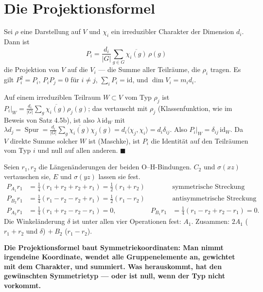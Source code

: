 \section{Die Projektionsformel}

\begin{merksatz}
Sei $\rho$ eine Darstellung auf $V$ und $\chi_i$ ein irreduzibler Charakter der Dimension $d_i$. Dann ist
\[ P_i = \frac{d_i}{|G|}\sum_{g\in G}\overline{\chi_i(g)}\,\rho(g) \]
die Projektion von $V$ auf die  $V_i$ --- die Summe aller Teilräume, die $\rho_i$ tragen. Es gilt $P_i^{2} = P_i$, $P_iP_j = 0$ für $i\neq j$, $\sum_iP_i = \mathrm{id}$, und $\dim V_i = m_id_i$.

Auf einem irreduziblen Teilraum $W\subset V$ vom Typ $\rho_j$ ist $P_i|_W = \frac{d_i}{|G|}\sum_g\overline{\chi_i(g)}\rho_j(g)$; das vertauscht mit $\rho_j$ (Klassenfunktion, wie im Beweis von Satz 4.5b), ist also $\lambda\,\mathrm{id}_W$ mit $\lambda d_j = \operatorname{Spur} = \frac{d_i}{|G|}\sum_g\overline{\chi_i(g)}\chi_j(g) = d_i\langle\chi_j, \chi_i\rangle = d_i\delta_{ij}$. Also $P_i|_W = \delta_{ij}\,\mathrm{id}_W$. Da $V$ direkte Summe solcher $W$ ist (Maschke), ist $P_i$ die Identität auf den Teilräumen vom Typ $i$ und null auf allen anderen. $\blacksquare$

Seien $r_1, r_2$ die Längenänderungen der beiden O--H-Bindungen. $C_2$ und $\sigma(xz)$ vertauschen sie, $E$ und $\sigma(yz)$ lassen sie fest.
\begin{align*}
P_{A_1}r_1 &= \tfrac14(r_1 + r_2 + r_2 + r_1) = \tfrac12(r_1 + r_2) & &\text{symmetrische Streckung}\\
P_{B_2}r_1 &= \tfrac14(r_1 - r_2 - r_2 + r_1) = \tfrac12(r_1 - r_2) & &\text{antisymmetrische Streckung}\\
P_{A_2}r_1 &= \tfrac14(r_1 + r_2 - r_2 - r_1) = 0, & P_{B_1}r_1 &= \tfrac14(r_1 - r_2 + r_2 - r_1) = 0 .
\end{align*}
Die Winkeländerung $\delta$ ist unter allen vier Operationen fest: $A_1$. Zusammen: $2A_1$ ($r_1 + r_2$ und $\delta$) $+\ B_2$ ($r_1 - r_2$). \checkmark

\begin{center}
\begin{minipage}{0.9\textwidth}
\textbf{Die Projektionsformel baut Symmetriekoordinaten: Man nimmt irgendeine Koordinate, wendet alle Gruppenelemente an, gewichtet mit dem Charakter, und summiert. Was herauskommt, hat den gewünschten Symmetrietyp --- oder ist null, wenn der Typ nicht vorkommt.}
\end{minipage}
\end{center}


\end{merksatz}

